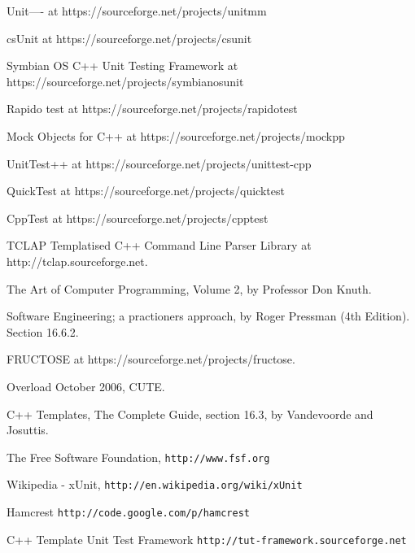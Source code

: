 \documentclass{book}
\begin{document}
 
\begin{thebibliography}{10} 
Unit---- at https://sourceforge.net/projects/unitmm

csUnit at https://sourceforge.net/projects/csunit

Symbian OS C++ Unit Testing Framework at https://sourceforge.net/projects/symbianosunit

Rapido test at https://sourceforge.net/projects/rapidotest

Mock Objects for C++ at https://sourceforge.net/projects/mockpp

UnitTest++ at https://sourceforge.net/projects/unittest-cpp


QuickTest at https://sourceforge.net/projects/quicktest

CppTest at https://sourceforge.net/projects/cpptest

TCLAP Templatised C++ Command Line Parser Library
at http://tclap.sourceforge.net.

The Art of Computer Programming, Volume 2,
by Professor Don Knuth.

Software Engineering; a practioners approach,
by Roger Pressman (4th Edition). Section 16.6.2.

FRUCTOSE at https://sourceforge.net/projects/fructose.

Overload October 2006, CUTE.

C++ Templates, The Complete Guide, section 16.3,
by Vandevoorde and Josuttis.

The Free Software Foundation, {\tt http://www.fsf.org}

Wikipedia - xUnit, {\tt http://en.wikipedia.org/wiki/xUnit}

Hamcrest {\tt http://code.google.com/p/hamcrest}

C++ Template Unit Test Framework {\tt http://tut-framework.sourceforge.net}

\end{thebibliography} 
\end{document}
